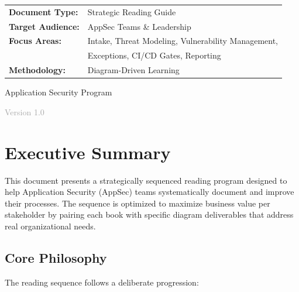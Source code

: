 \documentclass[11pt,letterpaper]{article}
\begin{document}
\begin{titlepage}
    \vspace{1.5cm}

    \begin{tabular}{ll}
        \textbf{Document Type:} & Strategic Reading Guide \\[0.3cm]
        \textbf{Target Audience:} & AppSec Teams \& Leadership \\[0.3cm]
        \textbf{Focus Areas:} & Intake, Threat Modeling, Vulnerability Management, \\
        & Exceptions, CI/CD Gates, Reporting \\[0.3cm]
        \textbf{Methodology:} & Diagram-Driven Learning \\
    \end{tabular}

    \vfill

    {\large Application Security Program\par}

    \vspace{0.5cm}

    {\small\textcolor{darkgray}{Version 1.0}\par}

\end{titlepage}

\tableofcontents
\newpage

\section{Executive Summary}

This document presents a strategically sequenced reading program designed to help Application Security (AppSec) teams systematically document and improve their processes. The sequence is optimized to maximize business value per stakeholder by pairing each book with specific diagram deliverables that address real organizational needs.

\subsection{Core Philosophy}

The reading sequence follows a deliberate progression:
\end{document}
